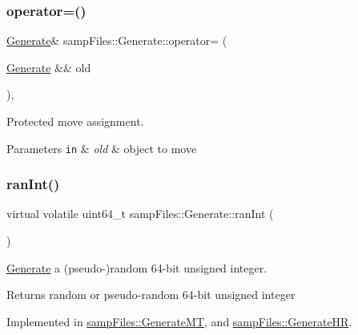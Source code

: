 \subsubsection{\texorpdfstring{operator=()}{operator=()}\hspace{0.1cm}{\footnotesize\ttfamily [2/2]}}
{\footnotesize\ttfamily \hyperlink{classsamp_files_1_1_generate}{Generate}\& samp\+Files\+::\+Generate\+::operator= (\begin{DoxyParamCaption}\item[{\hyperlink{classsamp_files_1_1_generate}{Generate} \&\&}]{old }\end{DoxyParamCaption})\hspace{0.3cm}{\ttfamily [protected]}, {\ttfamily [default]}}



Protected move assignment. 


\begin{DoxyParams}[1]{Parameters}
\mbox{\tt in}  & {\em old} & object to move \\
\hline
\end{DoxyParams}
\mbox{\label{classsamp_files_1_1_generate_a86fe4e68cc0809d4d936615fc60c125e}} 
\subsubsection{\texorpdfstring{ran\+Int()}{ranInt()}}
{\footnotesize\ttfamily virtual volatile uint64\+\_\+t samp\+Files\+::\+Generate\+::ran\+Int (\begin{DoxyParamCaption}{ }\end{DoxyParamCaption})\hspace{0.3cm}{\ttfamily [pure virtual]}}



\hyperlink{classsamp_files_1_1_generate}{Generate} a (pseudo-\/)random 64-\/bit unsigned integer. 

\begin{DoxyReturn}{Returns}
random or pseudo-\/random 64-\/bit unsigned integer 
\end{DoxyReturn}


Implemented in \hyperlink{classsamp_files_1_1_generate_m_t_a500e163265b6fdae0a30fdacc1c37f80}{samp\+Files\+::\+Generate\+MT}, and \hyperlink{classsamp_files_1_1_generate_h_r_ac0c560c9ea17bc67470124040e0bd796}{samp\+Files\+::\+Generate\+HR}.

